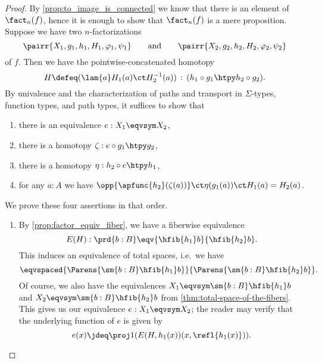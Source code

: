 \begin{proof}
By \cref{prop:to_image_is_connected} we know that there is an element of $\fact_n(f)$, hence it is enough to
show that $\fact_n(f)$ is a mere proposition. Suppose we have two $n$-factorizations
\begin{equation*}
\pairr{X_1,g_1,h_1,H_1,\varphi_1,\psi_1}\qquad\text{and}\qquad\pairr{X_2,g_2,h_2,H_2,\varphi_2,\psi_2}
\end{equation*}
of $f$. Then we have the pointwise-concatenated homotopy
\[ H\defeq (\lam{a} H_1(a) \ct H_2^{-1}(a)) \,:\, (h_1\circ g_1\htpy h_2\circ g_2).\]
By univalence and the characterization of paths and transport in $\Sigma$-types, function types, and path types, it suffices to show that
\begin{enumerate}
\item there is an equivalence $e:X_1\eqvsym X_2$,
\item there is a homotopy $\zeta:e\circ g_1\htpy g_2$,
\item there is a homotopy $\eta:h_2\circ e\htpy h_1$,
\item for any $a:A$ we have $\opp{\apfunc{h_2}(\zeta(a))} \ct \eta(g_1(a)) \ct H_1(a) = H_2(a)$.
\end{enumerate}
We prove these four assertions in that order.
\begin{enumerate}
\item By \cref{prop:factor_equiv_fiber}, we have a fiberwise equivalence
\begin{equation*}
E(H) : \prd{b:B} \eqv{\hfib{h_1}b}{\hfib{h_2}b}.
\end{equation*}
This induces an equivalence of total spaces, i.e.\ we have
\begin{equation*}
\eqvspaced{\Parens{\sm{b:B} \hfib{h_1}b}}{\Parens{\sm{b:B}\hfib{h_2}b}}.
\end{equation*}
Of course, we also have the equivalences $X_1\eqvsym\sm{b:B}\hfib{h_1}b$ and $X_2\eqvsym\sm{b:B}
\hfib{h_2}b$ from \cref{thm:total-space-of-the-fibers}.
This gives us our equivalence $e:X_1\eqvsym X_2$; the reader may verify that the underlying function of $e$ is given by
\begin{equation*}
e(x) \jdeq \proj1(E(H,h_1(x))(x,\refl{h_1(x)})).
\end{equation*}

\end{enumerate}
\end{proof}
